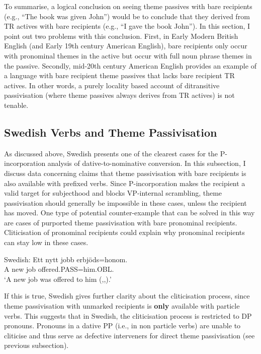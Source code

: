 To summarise, a logical conclusion on seeing theme passives with bare recipients (e.g., ``The book was given John'') would be to conclude that they derived from TR actives with bare recipients (e.g., ``I gave the book John''). In this section, I point out two problems with this conclusion. First, in Early Modern British English (and Early 19th century American English), bare recipients only occur with pronominal themes in the active but occur with full noun phrase themes in the passive. Secondly, mid-20th century American English provides an example of a language with bare recipient theme passives that lacks bare recipient TR actives. In other words, a purely locality based account of ditransitive passivisation (where theme passives always derives from TR actives) is not tenable.

\subsection{Swedish Verbs and Theme Passivisation}
As discussed above, Swedish presents one of the clearest cases for the P-incorporation analysis of dative-to-nominative conversion. In this subsection, I discuss data concerning claims that theme passivisation with bare recipients is also available with prefixed verbs. Since P-incorporation makes the recipient a valid target for subjecthood and blocks VP-internal scrambling, theme passivisation should generally be impossible in these cases, unless the recipient has moved. One type of potential counter-example that can be solved in this way are cases of purported theme passivisation with bare pronominal recipients. Cliticisation of pronominal recipients could explain why pronominal recipients can stay low in these cases.

\begin{exe}
	\ex Swedish:\label{ex:sw-offer-pass}
	\gll Ett nytt jobb erbjöds=honom.\\
A new job offered.PASS=him.OBL.\\
\trans `A new job was offered to him (\citealt{Anward.1989},\citealt{Falk.1990},\citealt{Lundquist.2006}).'
\end{exe}

If this is true, Swedish gives further clarity about the cliticisation process, since theme passivisation with unmarked recipients is \textbf{only} available with particle verbs. This suggests that in Swedish, the cliticisation process is restricted to DP pronouns. Pronouns in a dative PP (i.e., in non particle verbs) are unable to cliticise and thus serve as defective interveners for direct theme passivisation (see previous subsection).

